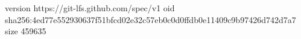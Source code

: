 version https://git-lfs.github.com/spec/v1
oid sha256:4ed77e552930637f51bfcd02e32c57eb0c0d0ffdb0e11409c9b97426d742d7a7
size 459635
